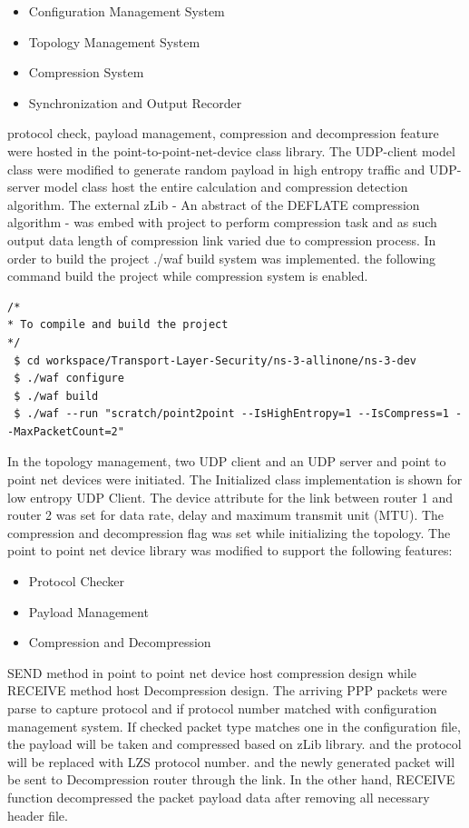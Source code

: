 \documentclass[sigconf]{acmart}
\begin{document}
\begin{itemize}
\item Configuration Management System
\item Topology Management System
\item Compression System
\item Synchronization and Output Recorder
\end{itemize}

protocol check, payload management, compression and decompression feature were hosted in the point-to-point-net-device class library. The UDP-client model class were modified to generate random payload in high entropy traffic and UDP-server model class host the entire calculation and compression detection algorithm. The external zLib \cite{Deutsch:1996:ZCD:RFC1950} - An abstract of the DEFLATE compression algorithm - was embed with project to perform compression task and as such output data length of compression link varied due to compression process.  
In order to build the project ./waf build system was implemented. the following command build the project while compression system is enabled. 
 
 \begin{lstlisting}
/*
* To compile and build the project
*/
 $ cd workspace/Transport-Layer-Security/ns-3-allinone/ns-3-dev    
 $ ./waf configure
 $ ./waf build
 $ ./waf --run "scratch/point2point --IsHighEntropy=1 --IsCompress=1 --MaxPacketCount=2"

\end{lstlisting}

In the topology management, two UDP client and an UDP server and point to point net devices were initiated. The Initialized class implementation is shown for low entropy UDP Client. The device attribute for the link between router 1 and router 2 was set for data rate, delay and maximum transmit unit (MTU). The compression and decompression flag was set while initializing the topology. The point to point net device library was modified to support the following features: 
 
\begin{itemize}
\item Protocol Checker
\item Payload Management
\item Compression and Decompression
\end{itemize}
 
 SEND method in point to point net device host compression design while RECEIVE method host Decompression design. The arriving PPP packets were parse to capture protocol and if protocol number matched with configuration management system. If checked packet type matches one in the configuration file, the payload will be taken and compressed based on zLib library. and the protocol will be replaced with LZS protocol number. and the newly generated packet will be sent to Decompression router through the link.  
In the other hand, RECEIVE function decompressed the packet payload data after removing all necessary header file.   
 
\end{document}

